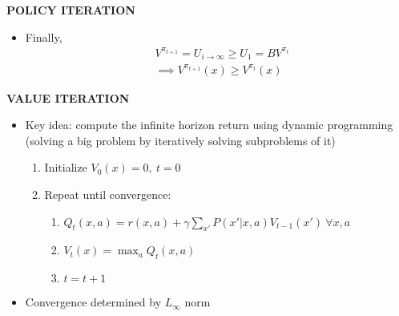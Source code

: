 \begin{whitebox}{\textbf{POLICY ITERATION}}
\begin{itemize}
\begin{itemize}
\begin{itemize}
\begin{align*}
                    &=U_{i-1}(x)
                \end{align*}
                \item Finally,
                \begin{align*}
                    &V^{\pi_{t+1}}=U_{i\to\infty}\geq U_1=BV^{\pi_t}\\
                    &\implies V^{\pi_{t+1}}(x)\geq V^{\pi_t}(x)
                \end{align*}
            \end{itemize}
        \end{itemize}
    \end{itemize}
\end{whitebox}

\begin{whitebox}{\textbf{VALUE ITERATION}}
    \begin{itemize}
        \item Key idea: compute the infinite horizon return using dynamic programming (solving a big problem by iteratively solving subproblems of it)
        \begin{enumerate}
            \item Initialize $V_0(x)=0,\ t=0$
            \item Repeat until convergence:
            \begin{enumerate}
                \item $Q_t(x,a)=r(x,a)+\gamma\sum_{x'}P(x'|x,a)V_{t-1}(x')\ \forall x,a$
                \item $V_t(x)=\max_aQ_t(x,a)$
                \item $t=t+1$
            \end{enumerate}
        \end{enumerate}
        \item Convergence determined by $L_\infty$ norm
    \end{itemize}
\end{whitebox}

